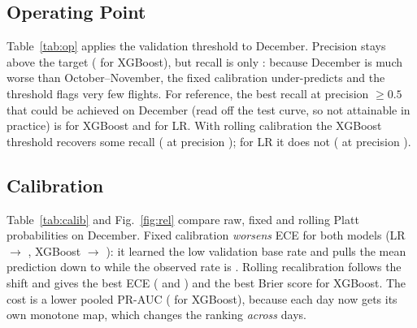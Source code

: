 \documentclass[conference]{IEEEtran}
\begin{document}
\begin{table}[t]
\caption{Effect of class weighting (raw probabilities)}
\label{tab:imbalance}
\centering
\resizebox{\columnwidth}{!}{}
\end{table}

\subsection{Operating Point}
Table~\ref{tab:op} applies the validation threshold to December. Precision stays above
the target (\XGBTestPrecThr{} for XGBoost), but recall is only \XGBTestRecallThr: because
December is much worse than October--November, the fixed calibration under-predicts and
the threshold flags very few flights. For reference, the best recall at precision
$\ge 0.5$ that could be achieved on December (read off the test curve, so not
attainable in practice) is \XGBTestRecallPfifty{} for XGBoost and \LRTestRecallPfifty{}
for LR. With rolling calibration the XGBoost threshold recovers some recall
(\XGBRollRecallThr{} at precision \XGBRollPrecThr); for LR it does not
(\LRRollRecallThr{} at precision \LRRollPrecThr).

\begin{table}[t]
\caption{Operating point chosen on validation (precision $\ge 0.5$), applied to December}
\label{tab:op}
\centering
\small
\resizebox{\columnwidth}{!}{}
\end{table}

\subsection{Calibration}
Table~\ref{tab:calib} and Fig.~\ref{fig:rel} compare raw, fixed and rolling Platt
probabilities on December. Fixed calibration \emph{worsens} ECE for both models (LR
\LRRawECE{} $\to$ \LRCalECE, XGBoost \XGBRawECE{} $\to$ \XGBCalECE): it learned the low
validation base rate and pulls the mean prediction down to \XGBMeanPredCal{} while the
observed rate is \TestRate. Rolling recalibration follows the shift and gives the best
ECE (\LRRollECE{} and \XGBRollECE) and the best Brier score for XGBoost. The cost is a
lower pooled PR-AUC (\XGBRollPRAUC{} for XGBoost), because each day now gets its own
monotone map, which changes the ranking \emph{across} days.

\begin{table}[t]
\caption{Calibration on December}
\label{tab:calib}
\centering
\small

\end{table}
\end{document}
